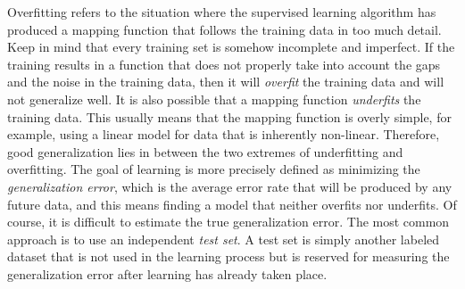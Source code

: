 Overfitting refers to the situation where the supervised learning algorithm has produced a mapping function that follows the training data in too much detail. Keep in mind that every training set is somehow incomplete and imperfect. If the training results in a function that does not properly take into account the gaps and the noise in the training data, then it will \emph{overfit} the training data and will not generalize well. It is also possible that a mapping function \emph{underfits} the training data. This usually means that the mapping function is overly simple, for example, using a linear model for data that is inherently non-linear. Therefore, good generalization lies in between the two extremes of underfitting and overfitting. The goal of learning is more precisely defined as minimizing the \emph{generalization error}, which is the average error rate that will be produced by any future data, and this means finding a model that neither overfits nor underfits. Of course, it is difficult to estimate the true generalization error. The most common approach is to use an independent \emph{test set}. A test set is simply another labeled dataset that is not used in the learning process but is reserved for measuring the generalization error after learning has already taken place.

